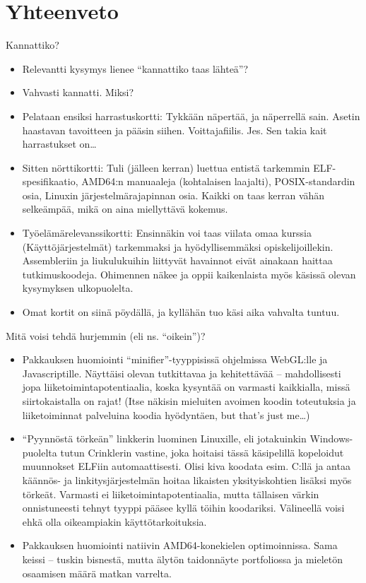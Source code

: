 \documentclass[pdf,10pt]{beamer}
\begin{document}
\section{Yhteenveto}
\begin{frame}{Kannattiko?}
  \begin{itemize}
  \item Relevantti kysymys lienee ``kannattiko taas lähteä''?
  \item Vahvasti kannatti. Miksi?
  \item Pelataan ensiksi harrastuskortti: Tykkään näpertää, ja
    näperrellä sain. Asetin haastavan tavoitteen ja pääsin
    siihen. Voittajafiilis. Jes. Sen takia kait harrastukset
    on\ldots
  \item Sitten nörttikortti: Tuli (jälleen kerran) luettua entistä
    tarkemmin ELF-spesifikaatio, AMD64:n manuaaleja (kohtalaisen
    laajalti), POSIX-standardin osia, Linuxin järjestelmärajapinnan
    osia. Kaikki on taas kerran vähän selkeämpää, mikä on aina
    miellyttävä kokemus.
  \item Työelämärelevanssikortti: Ensinnäkin voi taas viilata omaa
    kurssia (Käyttöjärjestelmät) tarkemmaksi ja hyödyllisemmäksi
    opiskelijoillekin. Assembleriin ja liukulukuihin liittyvät
    havainnot eivät ainakaan haittaa tutkimuskoodeja. Ohimennen näkee
    ja oppii kaikenlaista myös käsissä olevan kysymyksen ulkopuolelta.
  \item Omat kortit on siinä pöydällä, ja kyllähän tuo käsi aika
    vahvalta tuntuu.
  \end{itemize}
\end{frame}

\begin{frame}{Mitä voisi tehdä hurjemmin (eli ns. ``oikein'')?}
  \begin{itemize}
    \item Pakkauksen huomiointi ``minifier''-tyyppisissä ohjelmissa
      WebGL:lle ja Javascriptille. Näyttäisi olevan tutkittavaa ja
      kehitettävää -- mahdollisesti jopa liiketoimintapotentiaalia,
      koska kysyntää on varmasti kaikkialla, missä siirtokaistalla on
      rajat! (Itse näkisin mieluiten avoimen koodin toteutuksia ja
      liiketoiminnat palveluina koodia hyödyntäen, but that's just
      me\ldots)
    \item ``Pyynnöstä törkeän'' linkkerin luominen Linuxille, eli
      jotakuinkin Windows-puolelta tutun Crinklerin vastine, joka
      hoitaisi tässä käsipelillä kopeloidut muunnokset ELFiin
      automaattisesti. Olisi kiva koodata esim. C:llä ja antaa
      käännös- ja linkitysjärjestelmän hoitaa likaisten
      yksityiskohtien lisäksi myös törkeät. Varmasti ei
      liiketoimintapotentiaalia, mutta tällaisen värkin onnistuneesti
      tehnyt tyyppi pääsee kyllä töihin koodariksi. Välineellä voisi
      ehkä olla oikeampiakin käyttötarkoituksia.
    \item Pakkauksen huomiointi natiivin AMD64-konekielen
      optimoinnissa. Sama keissi -- tuskin bisnestä, mutta älytön
      taidonnäyte portfoliossa ja mieletön osaamisen määrä matkan
      varrelta.
  \end{itemize}
\end{frame}
\end{document}
